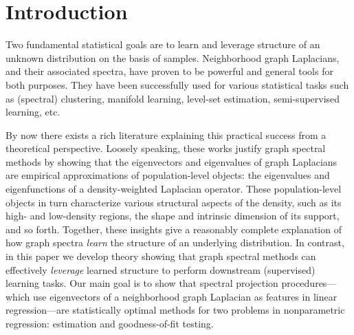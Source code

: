 \documentclass[aos]{imsart}
\theoremstyle{plain}
\theoremstyle{definition}
\theoremstyle{remark}
\newcommand{\1}{\mathbf{1}}
\begin{document}
\section{Introduction}
\label{sec:introduction}
Two fundamental statistical goals are to learn and leverage structure of an unknown distribution on the basis of samples. Neighborhood graph Laplacians, and their associated spectra, have proven to be powerful and general tools for both purposes. They have been successfully used for various statistical tasks such as (spectral) clustering, manifold learning, level-set estimation, semi-supervised learning, etc.

By now there exists a rich literature \citep{koltchinskii2000,belkin07,vonluxburg2008,burago2014,shi2015,singer2017,garciatrillos18,trillos2019, calder2019, cheng2021,dunson2021} explaining this practical success from a theoretical perspective. Loosely speaking, these works justify graph spectral methods by showing that the eigenvectors and eigenvalues of graph Laplacians are empirical approximations of population-level objects: the eigenvalues and eigenfunctions of a density-weighted Laplacian operator. These population-level objects in turn characterize various structural aspects of the density, such as its high- and low-density regions, the shape and intrinsic dimension of its support, and so forth. Together, these insights give a reasonably complete explanation of how graph spectra \emph{learn} the structure of an underlying distribution. In contrast, in this paper we develop theory showing that graph spectral methods can effectively \emph{leverage} learned structure to perform downstream (supervised) learning tasks. Our main goal is to show that spectral projection procedures---which use eigenvectors of a neighborhood graph Laplacian as features in linear regression---are statistically optimal methods for two problems in nonparametric regression: estimation and goodness-of-fit testing.
\end{document}
